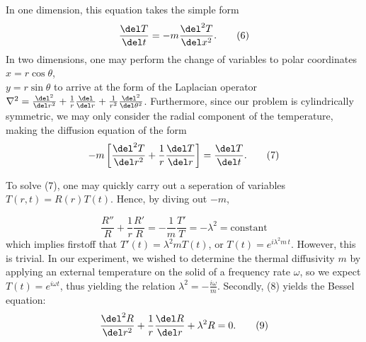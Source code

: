 \documentclass[11pt]{article}
\begin{document}
\begin{multicols}{2}
    In one dimension, this equation takes the simple form 
    \[
        \frac{\del T}{\del t} = -m\frac{\del^2 T}{\del x^2}. \tag{6}
    \]
    \nd In two dimensions, one may perform the change of variables to polar coordinates $x=r\cos\theta$, \\ $y=r\sin\theta$ to arrive at the form of the Laplacian operator $\nabla^2 = \frac{\del^2 }{\del r^2} + \frac{1}{r}\frac{\del}{\del r} + \frac{1}{r^2}\frac{\del^2}{\del\theta^2}$. Furthermore, since our problem is cylindrically symmetric, we may only consider the radial component of the temperature, making the diffusion equation of the form
    \[
        -m\left[\frac{\del^2 T}{\del r^2} + \frac{1}{r}\frac{\del T}{\del r}\right] = \frac{\del T}{\del t}. \tag{7} 
    \] 

    To solve (7), one may quickly carry out a seperation of variables $T(r,t) = R(r)T(t)$. Hence, by diving out $-m$, 

    \[
        \frac{R''}{R} + \frac{1}{r}\frac{R'}{R} = -\frac{1}{m}\frac{T'}{T} = -\lambda^2 = \text{constant} \tag{8}
    \]
    \nd which implies firstoff that $T'(t) = \lambda^2mT(t)$, or $T(t) = e^{i\lambda^2m\,t}$. However, this is trivial. In our experiment, we wished to determine the thermal diffusivity $m$ by applying an external temperature on the solid of a frequency rate $\omega$, so we expect $T(t) = e^{i\omega t}$, thus yielding the relation $\lambda^2 = -\frac{i\omega}{m}$. Secondly, (8) yields the Bessel equation:
    \[
        \frac{\del^2 R}{\del r^2} + \frac{1}{r}\frac{\del R}{\del r} + \lambda^2 R = 0. \tag{9}
    \]
    

\end{multicols}
\end{document}
